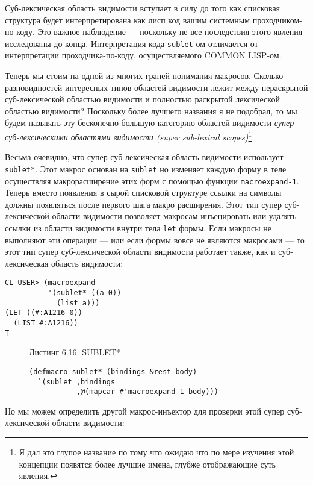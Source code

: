 Суб-лексическая область видимости вступает в силу до того как списковая структура будет интерпретирована как лисп код вашим системным проходчиком-по-коду. Это важное наблюдение --- поскольку не все последствия этого явления исследованы до конца. Интерпретация кода \verb"sublet"-ом отличается от интерпретации проходчика-по-коду, осуществляемого COMMON LISP-ом.

Теперь мы стоим на одной из многих граней понимания макросов. Сколько разновидностей интересных типов областей видимости лежит между нераскрытой суб-лексической областью видимости и полностью раскрытой лексической областью видимости? Поскольку более лучшего названия я не подобрал, то мы будем называть эту бесконечно большую категорию областей видимости \emph{супер суб-лексическими областями видимости (super sub-lexical scopes)}\footnote{Я дал это глупое название по тому что ожидаю что по мере изучения этой концепции появятся более лучшие имена, глубже отображающие суть явления.}.



Весьма очевидно, что супер суб-лексическая область видимости использует \verb"sublet*". Этот макрос основан на \verb"sublet" но изменяет каждую форму в теле осуществляя макрорасширение этих форм с помощью функции \verb"macroexpand-1". Теперь вместо появления в сырой списковой структуре ссылки на символы должны появляться после первого шага макро расширения. Этот тип супер суб-лексической области видимости позволяет макросам инъецировать или удалять ссылки из области видимости внутри тела \verb"let" формы. Если макросы не выполняют эти операции --- или если формы вовсе не являются макросами --- то этот тип супер суб-лексической области видимости работает также, как и суб-лексическая область видимости:

\begin{verbatim}
CL-USER> (macroexpand
          '(sublet* ((a 0))
            (list a)))
(LET ((#:A1216 0))
  (LIST #:A1216))
T
\end{verbatim}

\begin{figure}Листинг 6.16: SUBLET*\label{listing_6.16}
\listbegin
\begin{verbatim}
(defmacro sublet* (bindings &rest body)
  `(sublet ,bindings
           ,@(mapcar #'macroexpand-1 body)))
\end{verbatim}
\listend
\end{figure}

Но мы можем определить другой макрос-инъектор для проверки этой супер суб-лексической области видимости:

